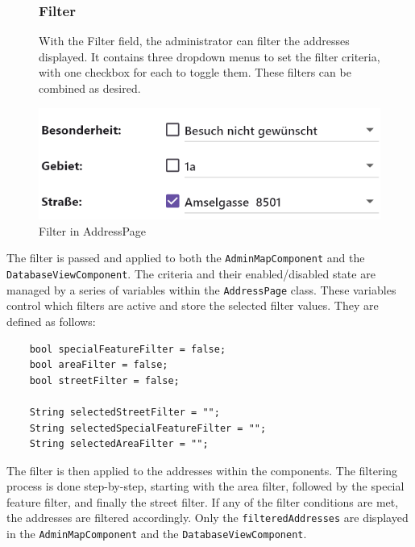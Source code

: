 \begin{figure}[H]
    \centering
    \begin{minipage}{0.55\textwidth} %
        \subsubsection{Filter}
        With the Filter field, the administrator can filter the addresses displayed. It contains three dropdown menus to set the filter criteria, with one checkbox for each to toggle them. These filters can be combined as desired. 
    \end{minipage}
    \hfill 
    \begin{minipage}{0.4\textwidth} %
        \centering
        \includegraphics[width=\linewidth]{images/AdminPanel/FilterField.png}
        \caption{Filter in AddressPage}
        \label{fig:adminpanel_filter}
    \end{minipage}
\end{figure}

The filter is passed and applied to both the \texttt{AdminMapComponent} and the \texttt{DatabaseViewComponent}. The criteria and their enabled/disabled state are managed by a series of variables within the \texttt{AddressPage} class. These variables control which filters are active and store the selected filter values. They are defined as follows:

\lstset{style=mycsharp, caption=Filter variables in AddressPage}
\begin{lstlisting}
    bool specialFeatureFilter = false;
    bool areaFilter = false;
    bool streetFilter = false;
    
    String selectedStreetFilter = "";
    String selectedSpecialFeatureFilter = "";
    String selectedAreaFilter = "";
\end{lstlisting}



The filter is then applied to the addresses within the components. The filtering process is done step-by-step, starting with the area filter, followed by the special feature filter, and finally the street filter. If any of the filter conditions are met, the addresses are filtered accordingly. Only the \texttt{filteredAddresses} are displayed in the \texttt{AdminMapComponent} and the \texttt{DatabaseViewComponent}.


